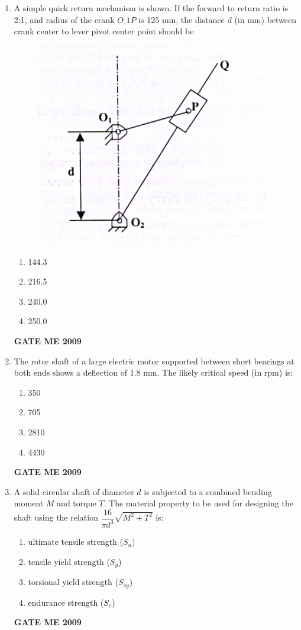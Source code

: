 \documentclass[journal]{IEEEtran}
\begin{document}
\begin{enumerate}[leftmargin=0pt]
\item A simple quick return mechanism is shown. If the forward to return ratio is 2:1, and radius of the crank $O\_1P$ is 125 mm, the distance $d$ (in mm) between crank center to lever pivot center point should be
    \begin{figure}[h]
      \centering
      \includegraphics[width=0.3\linewidth]{Figs/image (3).png}
    \end{figure}
    
  \begin{enumerate}[label=(\alph*)]
    \item 144.3
    \item 216.5
    \item 240.0
    \item 250.0
  \end{enumerate}
  \hfill{\textbf{GATE ME 2009}}


\item The rotor shaft of a large electric motor supported between short bearings at both ends shows a deflection of 1.8 mm. The likely critical speed (in rpm) is:
  \begin{enumerate}[label=(\alph*)]
    \item 350
    \item 705
    \item 2810
    \item 4430
  \end{enumerate}
  \hfill{\textbf{GATE ME 2009}}

\item A solid circular shaft of diameter $d$ is subjected to a combined bending moment $M$ and torque $T$. The material property to be used for designing the shaft using the relation $\dfrac{16}{\pi d^{3}} \sqrt{M^{2} + T^{2}}$ is:
  \begin{enumerate}[label=(\alph*)]
    \item ultimate tensile strength ($S_u$)
    \item tensile yield strength ($S_y$)
    \item torsional yield strength ($S_{sy}$)
    \item endurance strength ($S_e$)
  \end{enumerate}
  \hfill{\textbf{GATE ME 2009}}


\end{enumerate}
\end{document}
